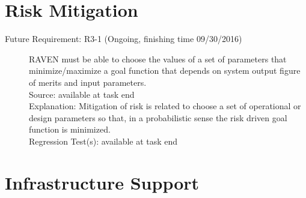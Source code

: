 \documentclass{article}
\newcommand{\futurerequirement}[6]{\item[Future Requirement: #1 #6] #2 \\Source: #3\\Explanation: #4\\Regression Test(s): #5}
\begin{document}
\section{Risk Mitigation}

\begin{description}

\futurerequirement{R3-1}{RAVEN must be able to choose the values of a set of parameters that minimize/maximize a goal function that depends on system output figure of merits and input parameters.}
{available at task end}
{Mitigation of risk is related to choose a set of operational or design parameters so that, in a probabilistic sense the risk driven goal function is minimized.}
{available at task end}
{(Ongoing, finishing time 09/30/2016)}
\end{description}

\section{Infrastructure Support}
\end{document}
